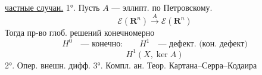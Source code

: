 \underline{частные случаи.}
1°. Пусть $A$ --- эллипт. по Петровскому.
\begin{equation*}
\mathcal E(\mathbf R^n)\overset A{\longrightarrow}\mathcal E(\mathbf R^n)
\end{equation*}
Тогда пр-во глоб. решений конечномерно
\begin{equation*}
H^0\quad\text{--- конечно:}\qquad H^1\quad\text{--- дефект. (кон. дефект)}
\end{equation*}
\begin{equation*}
H^1(X,\ker A)
\end{equation*}
2°. Опер. внешн. дифф.
3°. Компл. ан. Теор. Картана--Серра--Кодаира

